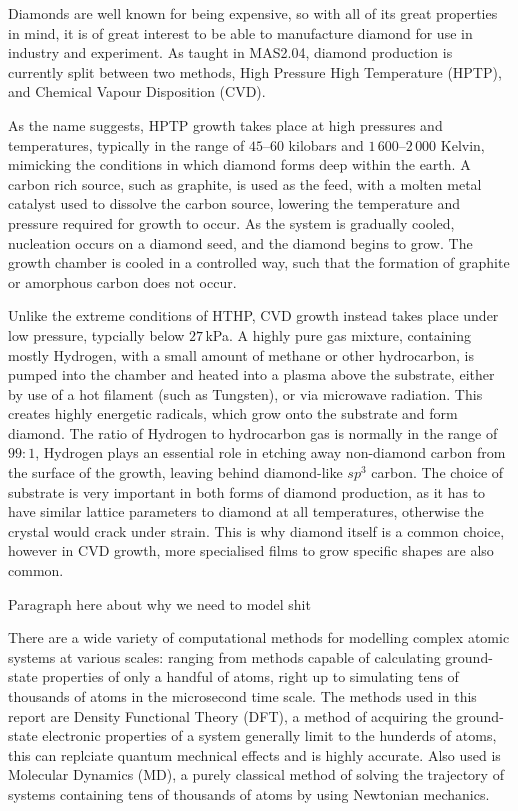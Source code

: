 \documentclass[10pt,a4paper,twocolumn,twoside]{extarticle}
\begin{document}
Diamonds are well known for being expensive, so with all of its great properties in mind, it is of great interest to be able to manufacture diamond for use in industry and experiment. As taught in MAS2.04, diamond production is currently split between two methods, High Pressure High Temperature (HPTP), and Chemical Vapour Disposition (CVD).

As the name suggests, HPTP growth takes place at high pressures and temperatures, typically in the range of $45$--$60$ kilobars and $1\,600$--$2\,000$ Kelvin, mimicking the conditions in which diamond forms deep within the earth. A carbon rich source, such as graphite, is used as the feed, with a molten metal catalyst used to dissolve the carbon source, lowering the temperature and pressure required for growth to occur. As the system is gradually cooled, nucleation occurs on a diamond seed, and the diamond begins to grow. The growth chamber is cooled in a controlled way, such that the formation of graphite or amorphous carbon does not occur.

Unlike the extreme conditions of HTHP, CVD growth instead takes place under low pressure, typcially below $27$\,kPa. A highly pure gas mixture, containing mostly Hydrogen, with a small amount of methane or other hydrocarbon, is pumped into the chamber and heated into a plasma above the substrate, either by use of a hot filament (such as Tungsten), or via microwave radiation. This creates highly energetic radicals, which grow onto the substrate and form diamond. The ratio of Hydrogen to hydrocarbon gas is normally in the range of $99:1$, Hydrogen plays an essential role in etching away non-diamond carbon from the surface of the growth, leaving behind diamond-like $sp^3$ carbon. 
The choice of substrate is very important in both forms of diamond production, as it has to have similar lattice parameters to diamond at all temperatures, otherwise the crystal would crack under strain. This is why diamond itself is a common choice, however in CVD growth, more specialised films to grow specific shapes are also common. 

Paragraph here about why we need to model shit

There are a wide variety of computational methods for modelling complex atomic systems at various scales: ranging from methods capable of calculating ground-state properties of only a handful of atoms, right up to simulating tens of thousands of atoms in the microsecond time scale. The methods used in this report are Density Functional Theory (DFT), a method of acquiring the ground-state electronic properties of a system generally limit to the hunderds of atoms, this can replciate quantum mechnical effects and is highly accurate. Also used is Molecular Dynamics (MD), a purely classical method of solving the trajectory of systems containing tens of thousands of atoms by using Newtonian mechanics.
\end{document}
